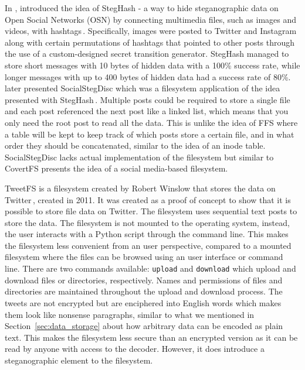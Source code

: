 In \citeyear{szczypiorskiStegHashNewMethod2016}, \citeauthor{szczypiorskiStegHashNewMethod2016} introduced the idea of StegHash - a way to hide steganographic data on Open Social Networks (\gls{OSN}) by connecting multimedia files, such as images and videos, with hashtags\,\cite{szczypiorskiStegHashNewMethod2016}. Specifically, images were posted to Twitter and Instagram along with certain permutations of hashtags that pointed to other posts through the use of a custom-designed secret transition generator. StegHash managed to store short messages with 10 bytes of hidden data with a 100\% success rate, while longer messages with up to 400 bytes of hidden data had a success rate of 80\%. \citeauthor{bieniaszSocialStegDiscApplicationSteganography2017} later presented SocialStegDisc which was a filesystem application of the idea presented with StegHash\,\cite{bieniaszSocialStegDiscApplicationSteganography2017}. Multiple posts could be required to store a single file and each post referenced the next post like a linked list, which means that you only need the root post to read all the data. This is unlike the idea of FFS where a table will be kept to keep track of which posts store a certain file, and in what order they should be concatenated, similar to the idea of an inode table. SocialStegDisc lacks actual implementation of the filesystem but similar to CovertFS presents the idea of a social media-based filesystem.

TweetFS is a filesystem created by Robert Winslow that stores the data on Twitter\,\cite{winslowTweetfsTweetfsMaster}, created in 2011. It was created as a proof of concept to show that it is possible to store file data on Twitter. The filesystem uses sequential text posts to store the data. The filesystem is not mounted to the operating system, instead, the user interacts with a Python script  through the command line. This makes the filesystem less convenient from an user perspective, compared to a mounted filesystem where the files can be browsed using an user interface or command line. There are two commands available: \texttt{upload} and \texttt{download} which upload and download files or directories, respectively. Names and permissions of files and directories are maintained throughout the upload and download process. The tweets are not encrypted but are enciphered into English words which makes them look like nonsense paragraphs, similar to what we mentioned in Section~\ref{sec:data_storage} about how arbitrary data can be encoded as plain text. This makes the filesystem less secure than an encrypted version as it can be read by anyone with access to the decoder. However, it does introduce a steganographic element to the filesystem.

